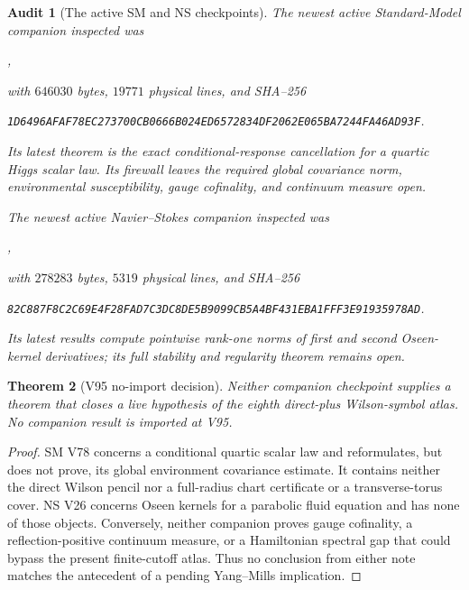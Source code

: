 \documentclass[11pt,oneside]{article}
\newtheorem{theorem}{Theorem}[section]
\newtheorem{audit}[theorem]{Audit}
\theoremstyle{definition}
\theoremstyle{remark}
\begin{document}
\begin{audit}[The active SM and NS checkpoints]
\label{aud:newv95-companions}
The newest active Standard-Model companion inspected was
\begin{center}\footnotesize
{},
\end{center}
with \(646030\) bytes, \(19771\) physical lines, and SHA--256
\begin{center}\scriptsize
\texttt{1D6496AFAF78EC273700CB0666B024ED6572834DF2062E065BA7244FA46AD93F}.
\end{center}
Its latest theorem is the exact conditional-response cancellation
for a quartic Higgs scalar law.  Its firewall leaves the required
global covariance norm, environmental susceptibility, gauge
cofinality, and continuum measure open.

The newest active Navier--Stokes companion inspected was
\begin{center}\footnotesize
{},
\end{center}
with \(278283\) bytes, \(5319\) physical lines, and SHA--256
\begin{center}\scriptsize
\texttt{82C887F8C2C69E4F28FAD7C3DC8DE5B9099CB5A4BF431EBA1FFF3E91935978AD}.
\end{center}
Its latest results compute pointwise rank-one norms of first and
second Oseen-kernel derivatives; its full stability and regularity
theorem remains open.
\end{audit}

\begin{theorem}[V95 no-import decision]
\label{thm:newv95-no-import}
Neither companion checkpoint supplies a theorem that closes a live
hypothesis of the eighth direct-plus Wilson-symbol atlas.  No
companion result is imported at V95.
\end{theorem}

\begin{proof}
SM V78 concerns a conditional quartic scalar law and reformulates,
but does not prove, its global environment covariance estimate.  It
contains neither the direct Wilson pencil nor a full-radius chart
certificate or a transverse-torus cover.  NS V26 concerns Oseen
kernels for a parabolic fluid equation and has none of those
objects.  Conversely, neither companion proves gauge cofinality, a
reflection-positive continuum measure, or a Hamiltonian spectral
gap that could bypass the present finite-cutoff atlas.  Thus no
conclusion from either note matches the antecedent of a pending
Yang--Mills implication.
\end{proof}
\end{document}
